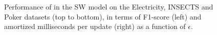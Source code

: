 \begin{figure}
\caption{Performance of \algo{} in the SW model on the Electricity, INSECTS and Poker datasets (top to bottom), in terms of F1-score (left) and amortized milliseconds per update (right) as a function of $\epsilon$.}\label{fig:SW}
\vspace*{10pt}
\end{figure}

